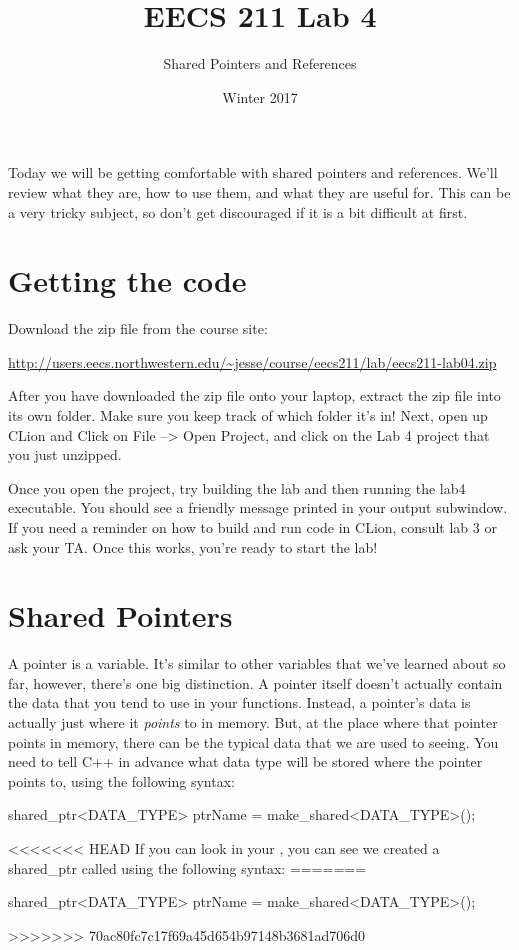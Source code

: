 \documentclass{tufte-handout}
\title{EECS 211 Lab 4}
\author{Shared Pointers and References}
\date{Winter 2017}
\begin{document}
\maketitle

Today we will be getting comfortable with shared pointers and references. We'll review what they are, how to use them, and what they are useful for.  This can be a very tricky subject, so don't get discouraged if it is a bit difficult at first.

\section{Getting the code}
Download the zip file from the course site: \medskip

\url{http://users.eecs.northwestern.edu/~jesse/course/eecs211/lab/eecs211-lab04.zip}

\medskip \noindent
After you have downloaded the zip file onto your laptop, extract the zip file into its own folder. Make sure you keep track of which folder it's in!  Next, open up CLion and Click on File --> Open Project, and click on the Lab 4 project that you just unzipped. 

Once you open the project, try building the lab and then running the lab4 executable. 
You should see a friendly message printed in your output subwindow.
If you need a reminder on how to build and run code in CLion, consult lab 3 or ask your TA.
Once this works, you're ready to start the lab!


\section{Shared Pointers}
A pointer is a variable. 
It's similar to other variables that we've learned about so far, however, there's one big distinction. 
A pointer itself doesn't actually contain the data that you tend to use in your functions.  
Instead, a pointer's data is actually just where it \textit{points} to in memory.
But, at the place where that pointer points in memory, there can be the typical data that we are used to seeing.  
You need to tell C++ in advance what data type will be stored where the pointer points to, using the following syntax:

\begin{Code}
shared_ptr<DATA_TYPE> ptrName = make_shared<DATA_TYPE>();
\end{Code}

<<<<<<< HEAD
\noindent
If you can look in your , you can see we created a shared\_ptr  called  using the following syntax:
=======
\begin{Code}
shared_ptr<DATA_TYPE> ptrName = make_shared<DATA_TYPE>();
\end{Code}
>>>>>>> 70ac80fc7c17f69a45d654b97148b3681ad706d0
\end{document}
